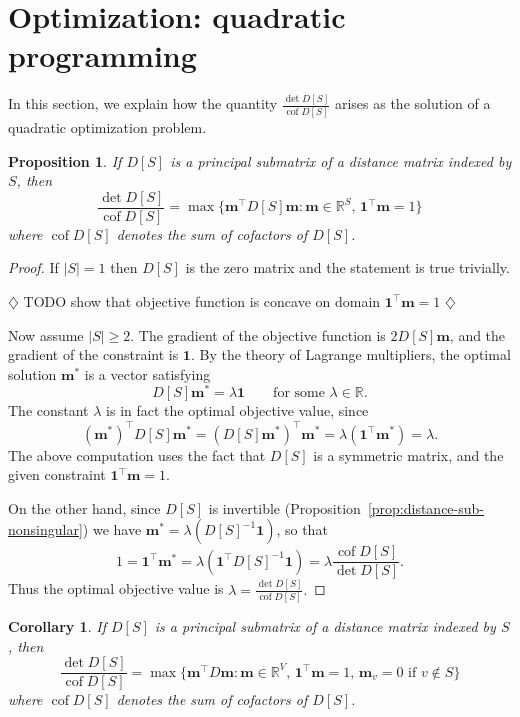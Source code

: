 \documentclass{amsart}
\newtheorem{prop}[thm]{Proposition}
\newtheorem{cor}[thm]{Corollary}
\theoremstyle{definition}
\newcommand{\RR}{\mathbb{R}}
\newcommand{\bone}{\mathbf{1}}
\newcommand{\boldm}{\mathbf{m}}
\newcommand{\tr}{\intercal}
\DeclareMathOperator{\cof}{cof}
\newcommand{\note}[1]{{\color{red} \sf $\diamondsuit$  {#1} $\diamondsuit$ }}
\begin{document}
\section{Optimization: quadratic programming}
\label{sec:optimization}

In this section, we explain how the quantity $\displaystyle \frac{\det D[S]}{\cof D[S]}$ arises as the solution of a quadratic optimization problem.

\begin{prop}
\label{prop:optimization}
If $D[S]$ is a principal submatrix of a distance matrix indexed by $S$, then 
\[
	\frac{\det D[S]}{\cof D[S]} = \max \{\boldm^\tr D[S] \boldm : \boldm \in \RR^S,\, \bone^\tr \boldm = 1 \}
\]
where $\cof D[S]$ denotes the sum of cofactors of $D[S]$.
\end{prop}

\begin{proof}
If $|S| = 1$ then $D[S]$ is the zero matrix and the statement is true trivially.

\note{TODO show that objective function is concave on domain $\bone^\tr \boldm = 1$}

Now assume $|S| \geq 2$.
The gradient of the objective function is $2 D[S] \boldm$, 
and the gradient of the constraint is $\bone$.
By the theory of Lagrange multipliers, the optimal solution $\boldm^*$ is a vector satisfying
\[
	D[S] \boldm^* = \lambda \bone \qquad\text{for some }\lambda \in \RR.
\]
The constant $\lambda$ is in fact the optimal objective value, since
\[
	(\boldm^*)^\tr D[S] \boldm^* = (D[S] \boldm^*)^\tr \boldm^* = \lambda (\bone^\tr \boldm^*) = \lambda.
\]
The above computation uses the fact that $D[S]$ is a symmetric matrix, and the given constraint $\bone^\tr \boldm = 1$.

On the other hand,
since $D[S]$ is invertible (Proposition~\ref{prop:distance-sub-nonsingular}) we have $ \boldm^* = \lambda (D[S]^{-1} \bone) $, so that
\[
	1 = \bone^\tr \boldm^* = \lambda (\bone^\tr D[S]^{-1} \bone)
	= \lambda \frac{\cof D[S]}{\det D[S]}.
\]
Thus the optimal objective value is
$\displaystyle
	\lambda = \frac{\det D[S]}{\cof D[S]} .
$
\end{proof}

\begin{cor}
\label{cor:optimization}
If $D[S]$ is a principal submatrix of a distance matrix indexed by $S$, then 
\[
	\frac{\det D[S]}{\cof D[S]} = \max \{\boldm^\tr D \boldm : \boldm \in \RR^V,\, \bone^\tr \boldm = 1,\, \boldm_v = 0 \text{ if } v \not\in S \}
\]
where $\cof D[S]$ denotes the sum of cofactors of $D[S]$.
\end{cor}
\end{document}
